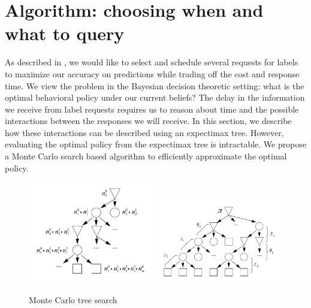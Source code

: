 \section{Algorithm: choosing when and what to query}
\label{sec:async}

As described in , we would like to select and schedule several requests for labels to maximize our accuracy on predictions while trading off the cost and response time. 
We view the problem in the Bayesian decision theoretic setting: what is the optimal behavioral policy under our current beliefs?
The delay in the information we receive from label requests requires us to reason about time and the possible interactions between the responses we will receive.
In this section, we describe how these interactions can be described using an expectimax tree.
However, evaluating the optimal policy from the expectimax tree is intractable.
We propose a Monte Carlo search based algorithm to efficiently approximate the optimal policy.


\begin{figure}
  \includegraphics[width=0.49\textwidth,height=0.23\textheight,keepaspectratio]{figures/game-tree.pdf}
  \hfill
  \includegraphics[width=0.49\textwidth,height=0.23\textheight,keepaspectratio]{figures/lookahead-one.pdf}
  \caption{Monte Carlo tree search}
\label{fig:mcts}
\end{figure}

